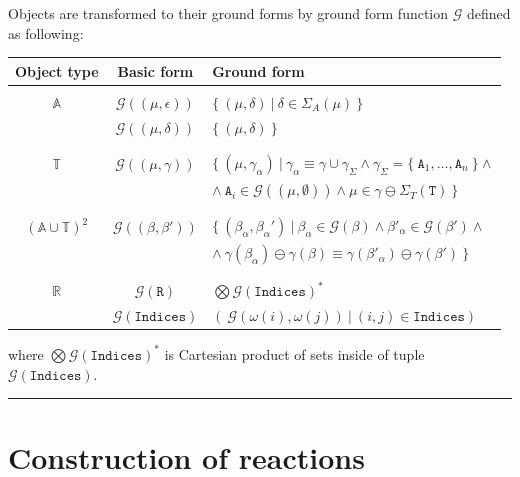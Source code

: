 \documentclass[12pt]{fithesis2}
\begin{document}
Objects are transformed to their ground forms by ground form function $\mathcal{G}$ defined as following:

\begin{center}
\begin{tabular}{ c c l }
Object type & Basic form & Ground form \\
\hline
 & & \\
$\mathds{A}$ & $\mathcal{G}((\mu, \epsilon))$ & $\{~ (\mu, \delta) ~|~ \delta \in \Sigma_A(\mu) ~\}$\\
 & $\mathcal{G}((\mu, \delta))$ & $\{~(\mu, \delta) ~\}$\\
 & & \\
 \hline
 & & \\
$\mathds{T}$ & $\mathcal{G}((\mu, \gamma))$ & $\{~ (\mu, \gamma_\alpha) ~|~ \gamma_\alpha \equiv \gamma \cup \gamma_\Sigma \wedge \gamma_\Sigma = \{~ \mathtt{A}_1, \ldots, \mathtt{A}_n ~\} \wedge$\\
 & & $\wedge~ \mathtt{A}_i \in \mathcal{G}((\mu, \emptyset)) \wedge \mu \in \gamma \ominus \Sigma_T(\mathtt{T}) ~\}$ \\
 & & \\
 \hline
 & & \\
$(\mathds{A} \cup \mathds{T})^2$ & $\mathcal{G}((\beta, \beta'))$ & $\{~ (\beta_\alpha, \beta_\alpha') ~|~ \beta_\alpha \in \mathcal{G}(\beta) \wedge \beta'_\alpha \in \mathcal{G}(\beta') \wedge$\\
 & & $\wedge~ \gamma(\beta_\alpha) \ominus \gamma(\beta) \equiv \gamma(\beta'_\alpha) \ominus \gamma(\beta') ~\} $ \\
 & & \\
 \hline
 & & \\
$\mathds{R}$ & $\mathcal{G}(\mathtt{R})$ & $ \bigotimes \mathcal{G}(\mathtt{Indices})^* $ \\
 & $\mathcal{G}(\mathtt{Indices})$ & $(~\mathcal{G}(\omega(i), \omega(j)) ~|~ (i,j) \in \mathtt{Indices})$\\
 
\end{tabular}
\end{center}

where $\bigotimes \mathcal{G}(\mathtt{Indices})^*$ is Cartesian product of sets inside of tuple $\mathcal{G}(\mathtt{Indices})$.

\noindent\rule{\textwidth}{2pt}

\section{Construction of reactions}
\label{Generating reactions}
\end{document}
